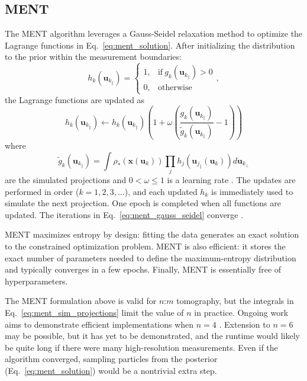\documentclass[%
    reprint,
    twocolumn,
    nofootinbib,
    amsmath,
    amssymb,
    aps,
    prstab,
]{revtex4-2}
\newcommand{\vect}[1]{\boldsymbol{\mathbf{#1}}}
\begin{document}
\subsection{MENT}\label{subsec:MENT}

The MENT algorithm \cite{Minerbo_1979, Dusaussoy_1991, Mottershead_1996, Wong_2022} leverages a Gauss-Seidel relaxation method to optimize the Lagrange functions in Eq.~\eqref{eq:ment_solution}. After initializing the distribution to the prior within the measurement boundaries:
%
\begin{equation} \label{eq:ment_initialization}
    h_k(\vect{u}_{k_\parallel}) = 
    \begin{cases}
        1, & \text{if}\ g_k(\vect{u}_{k_\parallel}) > 0  \\
        0, & \text{otherwise}
    \end{cases},
\end{equation}
%
the Lagrange functions are updated as
%
\begin{equation} \label{eq:ment_gauss_seidel}
    h_k( \vect{u}_{k_\parallel} ) \leftarrow
    h_k( \vect{u}_{k_\parallel} )
    \left(
        1 + \omega
        \left(
            \frac
            {g_k(\vect{u}_{k_\parallel})}
            {\tilde{g}_k(\vect{u}_{k_\parallel})}
            - 1
        \right)
    \right)
\end{equation}
%
where
%
\begin{equation} \label{eq:ment_sim_projections}
    \tilde{g}_k(\vect{u}_{k_\parallel}) 
    =
    \int{
        \rho_*(\vect{x}(\vect{u}_k))
        \prod \limits_{j}
        h_j ( \vect{u}_{j_\parallel} (\vect{u}_k) )
        d\vect{u}_{k_\perp}
    }
\end{equation}
%
are the simulated projections and $0 < \omega \le 1$ is a learning rate \cite{Mottershead_1996}. The updates are performed in order ($k = 1, 2, 3, \dots$), and each updated $h_k$ is immediately used to simulate the next projection. One epoch is completed when all functions are updated. The iterations in Eq.~\eqref{eq:ment_gauss_seidel} converge \cite{Minerbo_1979, Dusaussoy_1991}. 

MENT maximizes entropy by design: fitting the data generates an exact solution to the constrained optimization problem. MENT is also efficient: it stores the exact number of parameters needed to define the maximum-entropy distribution and typically converges in a few epochs. Finally, MENT is essentially free of hyperparameters.

The MENT formulation above is valid for $n$:$m$ tomography, but the integrals in Eq.~\eqref{eq:ment_sim_projections} limit the value of $n$ in practice. Ongoing work aims to demonstrate efficient implementations when $n = 4$ \cite{Wong_2022, Tran_2023_ipac}. Extension to $n = 6$ may be possible, but it has yet to be demonstrated, and the runtime would likely be quite long if there were many high-resolution measurements. Even if the algorithm converged, sampling particles from the posterior (Eq.~\eqref{eq:ment_solution}) would be a nontrivial extra step.
\end{document}
